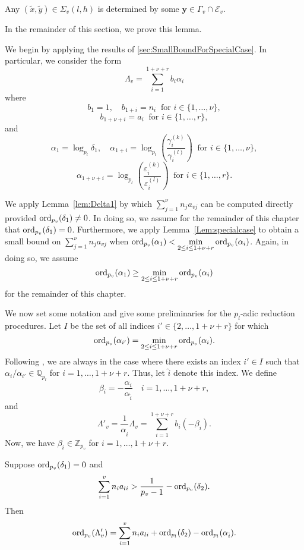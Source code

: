 \begin{lemma} \label{lem:mainnonarch}
Any $(\tilde{x},\tilde{y}) \in \Sigma_v(l,h)$ is determined by some $\mathbf{y} \in \Gamma_v \cap \mathcal{E}_v$. 
\end{lemma}

In the remainder of this section, we prove this lemma. 

We begin by applying the results of \autoref{sec:SmallBoundForSpecialCase}. In particular, we consider the form
\[\Lambda_v = \sum_{i = 1}^{1+\nu+r} b_i\alpha_i\]
where
\[b_1 = 1, \quad b_{1+i} = n_i \ \text{ for } i \in \{1, \dots, \nu\},\]
\[ b_{1 + \nu+i} = a_i \ \text{ for } i \in \{1, \dots, r\},\]
and
\[\alpha_1 = \log_{p_l} \delta_1, \quad \alpha_{1+i} = \log_{p_l}\left( \frac{\gamma_i^{(k)}}{\gamma_i^{(l)}}\right)  \ \text{ for } i \in \{1, \dots, \nu\},\]
\[\alpha_{1+ \nu+i} = \log_{p_l}\left( \frac{\varepsilon_i^{(k)}}{\varepsilon_i^{(l)}}\right)
\ \text{ for } i \in \{1, \dots, r\}.\]

We apply Lemma~\ref{lem:Delta1} by which $\sum_{j = 1}^{\nu} n_ja_{vj}$ can be computed directly provided ${\operatorname{ord}_{p_v}(\delta_1) \neq 0}$. In doing so, we assume for the remainder of this chapter that $\operatorname{ord}_{p_v}(\delta_1) = 0$. Furthermore, we apply Lemma~\ref{Lem:specialcase} to obtain a small bound on $\sum_{j = 1}^{\nu} n_ja_{vj}$ when $\operatorname{ord}_{p_v}(\alpha_1) < \displaystyle \min_{2 \leq i \leq 1+\nu+r} \operatorname{ord}_{p_v}(\alpha_i)$. Again, in doing so, we assume 
\[\operatorname{ord}_{p_v}(\alpha_1) \geq \displaystyle \min_{2 \leq i \leq 1+\nu+r} \operatorname{ord}_{p_v}(\alpha_i)\]
for the remainder of this chapter. 

We now set some notation and give some preliminaries for the $p_l$-adic reduction procedures. Let $I$ be the set of all indices $i' \in \{2, \dots, 1+ \nu + r\}$ for which
\[\operatorname{ord}_{p_v}(\alpha_{i'}) = \min_{2\leq i\leq 1+ \nu+ r} \operatorname{ord}_{p_v}(\alpha_i).\]
Following \cite{Ham}, we are always in the case where there exists an index $i' \in I$ such that $\alpha_i/\alpha_{i'} \in \mathbb{Q}_{p_l}$ for $i = 1, \dots, 1+ \nu+ r$. Thus, let $\hat{i}$ denote this index. We define
\[\beta_i = - \frac{\alpha_i}{\alpha_{\hat{i}}} \quad i = 1, \dots, 1+ \nu+ r,\]
and 
\[\Lambda'_v = \frac{1}{\alpha_{\hat{i}}}\Lambda_v = \sum_{i = 1}^{1+ \nu+ r} b_i(-\beta_i).\]
Now, we have $\beta_i \in \mathbb{Z}_{p_v}$ for $i = 1, \dots, 1+ \nu+ r$. 

\begin{lemma} \label{Lem:19.1}
Suppose $\operatorname{ord}_{p_v}(\delta_1) = 0$ and 
\[\sum_{i = 1}^v n_{i}a_{li} > \frac{1}{p_v-1} - \operatorname{ord}_{p_v}(\delta_2).\]
Then
\[\operatorname{ord}_{p_v}(\Lambda_v') = \sum_{i = 1}^v n_{i}a_{li} + \operatorname{ord}_{p_l}(\delta_2) - \operatorname{ord}_{p_l}(\alpha_{\hat{i}}).\]
\end{lemma}

